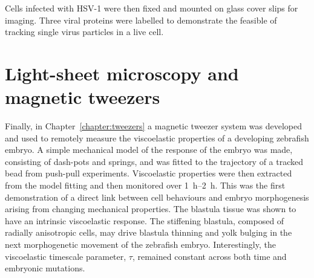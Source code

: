 Cells infected with \gls{HSV}-1 were then fixed and mounted on glass cover slips for imaging.
Three viral proteins were labelled to demonstrate the feasible of tracking single virus particles in a live cell.

\section{Light-sheet microscopy and magnetic tweezers}
Finally, in Chapter~\ref{chapter:tweezers} a magnetic tweezer system was developed and used to remotely measure the viscoelastic properties of a developing zebrafish embryo.
A simple mechanical model of the response of the embryo was made, consisting of dash-pots and springs, and was fitted to the trajectory of a tracked bead from push-pull experiments.
Viscoelastic properties were then extracted from the model fitting and then monitored over \SIrange{1}{2}{\hour}.
This was the first demonstration of a direct link between cell behaviours and embryo morphogenesis arising from changing mechanical properties.
The blastula tissue was shown to have an intrinsic viscoelastic response.
The stiffening blastula, composed of radially anisotropic cells, may drive blastula thinning and yolk bulging in the next morphogenetic movement of the zebrafish embryo.
Interestingly, the viscoelastic timescale parameter, \(\tau\), remained constant across both time and embryonic mutations.
%
